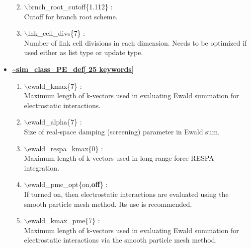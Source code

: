 \begin{itemize}
\begin{enumerate}
 \vspace{0.15in} \Large
 \item   $\backslash$brnch\_root\_cutoff\{1.112\} : \\
   \large
   Cutoff for branch root scheme.

 \vspace{0.15in} \Large
 \item   $\backslash$lnk\_cell\_divs\{7\} : \\
  \large
   Number of link cell divisions in each dimension.  Needs to be optimized
   if used either as list type or update type.

\end{enumerate}

\clearpage
\huge
\item[] \underline{\bf \~{}sim\_class\_PE\_def[ 25 keywords]}
\begin{enumerate}

 \vspace{0.15in} \Large
 \item   $\backslash$ewald\_kmax\{7\} : \\
  \large
  Maximum length of k-vectors used in evaluating Ewald summation for 
  electrostatic interactions.

 \vspace{0.15in} \Large
 \item   $\backslash$ewald\_alpha\{7\} : \\
  \large
  Size of real-space damping (screening) parameter in Ewald sum.

 \vspace{0.15in} \Large
 \item   $\backslash$ewald\_respa\_kmax\{0\} : \\
  \large
   Maximum length of k-vectors used in long range force RESPA integration.

 \vspace{0.15in}\Large
 \item   $\backslash$ewald\_pme\_opt\{on,{\bf off}\} : \\
  \large
  If turned on, then electrostatic interactions are evaluated using the
  smooth particle mesh method.  Its use is recommended.

 \vspace{0.15in} \Large
 \item   $\backslash$ewald\_kmax\_pme\{7\} : \\
  \large
  Maximum length of k-vectors used in evaluating Ewald summation for 
  electrostatic interactions via the smooth particle mesh method.


\end{enumerate}
\end{itemize}

